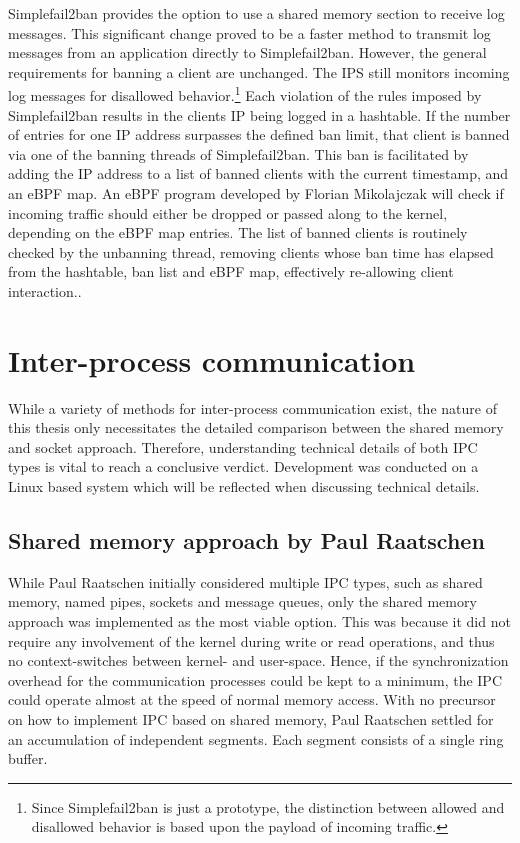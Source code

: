 Simplefail2ban provides the option to use a shared memory section to receive log messages.
This significant change proved to be a faster method to transmit log messages from an application directly to Simplefail2ban.
However, the general requirements for banning a client are unchanged.
The \ac{IPS} still monitors incoming log messages for disallowed behavior.\footnote{Since Simplefail2ban is just a prototype, the distinction between allowed and disallowed behavior is based upon the payload of incoming traffic.}
Each violation of the rules imposed by Simplefail2ban results in the clients \ac{IP} being logged in a hashtable.
If the number of entries for one \ac{IP} address surpasses the defined ban limit, that client is banned via one of the banning threads of Simplefail2ban.
This ban is facilitated by adding the \ac{IP} address to a list of banned clients with the current timestamp, and an \ac{eBPF} map.
An \ac{eBPF} program developed by Florian Mikolajczak will check if incoming traffic should either be dropped or passed along to the kernel, depending on the \ac{eBPF} map entries\cite{mikolajczak:ebpf}.
The list of banned clients is routinely checked by the unbanning thread, removing clients whose ban time has elapsed from the hashtable, ban list and \ac{eBPF} map, effectively re-allowing client interaction.\cite{raatschen:ipc}.

\section{Inter-process communication}
While a variety of methods for inter-process communication exist, the nature of this thesis only necessitates the detailed comparison between the shared memory and socket approach.
Therefore, understanding technical details of both \ac{IPC} types is vital to reach a conclusive verdict.
Development was conducted on a Linux based system which will be reflected when discussing technical details.

\subsection{Shared memory approach by Paul Raatschen}
While Paul Raatschen initially considered multiple \ac{IPC} types, such as shared memory, named pipes, sockets and message queues, only the shared memory approach was implemented as the most viable option.
This was because it did not require any involvement of the kernel during write or read operations, and thus no context-switches between kernel- and user-space.
Hence, if the synchronization overhead for the communication processes could be kept to a minimum, the \ac{IPC} could operate almost at the speed of normal memory access.
With no precursor on how to implement \ac{IPC} based on shared memory, Paul Raatschen settled for an accumulation of independent segments.
Each segment consists of a single ring buffer.\cite{raatschen:ipc}

